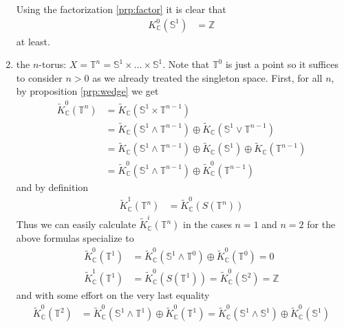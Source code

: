 \begin{exa}
\begin{enumerate}
Using the factorization \ref{prp:factor} it is clear that
\begin{align*}
  K_{\mathbb{C}}^{0}(\mathbb{S}^{1})
  &=
  \mathbb{Z}
\end{align*}
at least.
\item
  the $n$-torus: $X = \mathbb{T}^{n} = \mathbb{S}^{1} \times \ldots \times \mathbb{S}^{1}$. Note that $\mathbb{T}^{0}$ is just a point so it suffices to consider $n > 0$ as we already treated the singleton space. First, for all $n$, by proposition \ref{prp:wedge} we get
\begin{align*}
  \tilde{K}_{\mathbb{C}}^{0}(\mathbb{T}^{n})
  &=
  \tilde{K}_{\mathbb{C}}(\mathbb{S}^{1} \times \mathbb{T}^{n-1})
  \\
  &=
  \tilde{K}_{\mathbb{C}}(\mathbb{S}^{1} \wedge \mathbb{T}^{n-1})
  \oplus
  \tilde{K}_{\mathbb{C}}(\mathbb{S}^{1} \vee \mathbb{T}^{n-1})
  \\
  &=
  \tilde{K}_{\mathbb{C}}(\mathbb{S}^{1} \wedge \mathbb{T}^{n-1})
  \oplus
  \tilde{K}_{\mathbb{C}}(\mathbb{S}^{1})
  \oplus
  \tilde{K}_{\mathbb{C}}(\mathbb{T}^{n-1})
  \\
  &=
  \tilde{K}_{\mathbb{C}}^{0}(\mathbb{S}^{1} \wedge \mathbb{T}^{n-1})
  \oplus
  \tilde{K}_{\mathbb{C}}^{0}(\mathbb{T}^{n-1})
\end{align*}
and by definition
\begin{align*}
  \tilde{K}_{\mathbb{C}}^{1}(\mathbb{T}^{n})
  &=
  \tilde{K}_{\mathbb{C}}^{0}(S(\mathbb{T}^{n}))
\end{align*}
Thus we can easily calculate $\tilde{K}_{\mathbb{C}}^{i}(\mathbb{T}^{n})$ in the cases $n = 1$ and $n = 2$ for the above formulas specialize to
\begin{align*}
  \tilde{K}_{\mathbb{C}}^{0}(\mathbb{T}^{1})
  &=
  \tilde{K}_{\mathbb{C}}^{0}(\mathbb{S}^{1} \wedge \mathbb{T}^{0})
  \oplus
  \tilde{K}_{\mathbb{C}}^{0}(\mathbb{T}^{0})
  =
  0
  \\
  \tilde{K}_{\mathbb{C}}^{1}(\mathbb{T}^{1})
  &=
  \tilde{K}_{\mathbb{C}}^{0}(S(\mathbb{T}^{1}))
  =
  \tilde{K}_{\mathbb{C}}^{0}(\mathbb{S}^{2})
  =
  \mathbb{Z}
\end{align*}
and with some effort on the very last equality
\begin{align*}
  \tilde{K}_{\mathbb{C}}^{0}(\mathbb{T}^{2})
  &=
  \tilde{K}_{\mathbb{C}}^{0}(\mathbb{S}^{1} \wedge \mathbb{T}^{1})
  \oplus
  \tilde{K}_{\mathbb{C}}^{0}(\mathbb{T}^{1})
  =
  \tilde{K}_{\mathbb{C}}^{0}(\mathbb{S}^{1} \wedge \mathbb{S}^{1})
  \oplus
  \tilde{K}_{\mathbb{C}}^{0}(\mathbb{S}^{1})

\end{align*}
\end{enumerate}
\end{exa}
